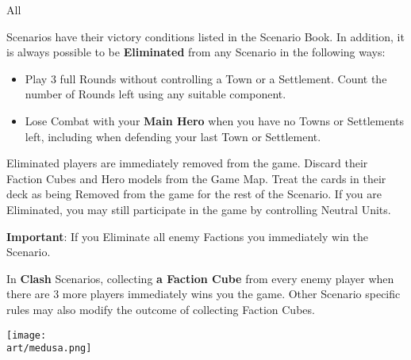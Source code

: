 
\begin{multicols*}{2}

\hypertarget{End}{All} Scenarios have their victory conditions listed in the Scenario Book.
In addition, it is always possible to be \textbf{Eliminated} from any Scenario in the following ways:
\begin{itemize}
  \item Play 3 full Rounds without controlling a Town or a Settlement.
    Count the number of Rounds left using any suitable component.
  \item Lose Combat with your \textbf{Main Hero} when you have no Towns or Settlements left, including when defending your last Town or Settlement.
\end{itemize}
Eliminated players are immediately removed from the game.
Discard their Faction Cubes and Hero models from the Game Map.
Treat the cards in their deck as being Removed from the game for the rest of the Scenario.
If you are Eliminated, you may still participate in the game by controlling Neutral Units.\par
\textbf{Important}: If you Eliminate all enemy Factions you immediately win the Scenario.\par
In \textbf{Clash} Scenarios, collecting \textbf{a Faction Cube} from every enemy player when there are 3 more players immediately wins you the game.
Other Scenario specific rules may also modify the outcome of collecting Faction Cubes.

\columnbreak
\vspace*{\fill}
\hspace{-6em}
\texttt{[image: \\art/medusa.png]}

\end{multicols*}

